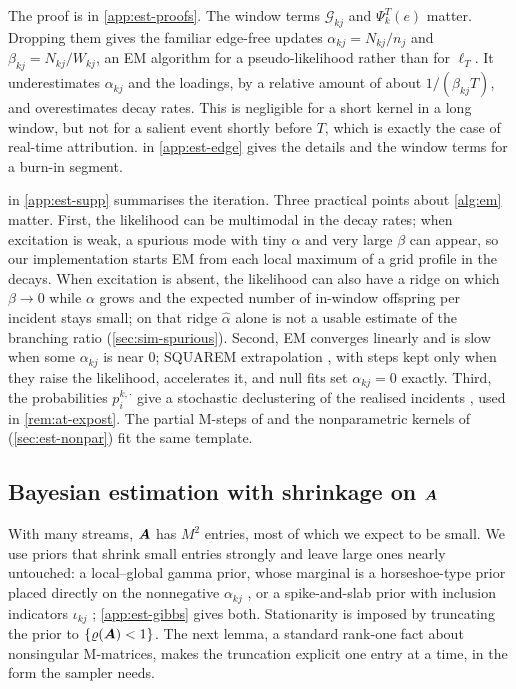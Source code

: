The proof is in \cref{app:est-proofs}. The window terms $\mathcal G_{kj}$ and
$\Psi^T_k(e)$ matter. Dropping them gives the familiar edge-free updates
$\alpha_{kj}=N_{kj}/n_j$ and $\beta_{kj}=N_{kj}/W_{kj}$, an EM algorithm for a
pseudo-likelihood rather than for $\ell_T$. It underestimates $\alpha_{kj}$ and the loadings,
by a relative amount of about $1/(\beta_{kj}T)$, and overestimates decay rates. This is
negligible for a short kernel in a long window, but not for a salient event shortly before
$T$, which is exactly the case of real-time attribution.  in
\cref{app:est-edge} gives the details and the window terms for a burn-in segment.

 in \cref{app:est-supp} summarises the iteration. Three practical points about \cref{alg:em} matter. First, the likelihood can be
multimodal in the decay rates; when excitation is weak, a spurious mode with tiny $\alpha$
and very large $\beta$ can appear, so our implementation starts EM from each local maximum
of a grid profile in the decays. When excitation is absent, the likelihood can also have a
ridge on which $\beta\to0$ while $\alpha$ grows and the expected number of in-window
offspring per incident stays small; on that ridge $\hat\alpha$ alone is not a usable
estimate of the branching ratio (\cref{sec:sim-spurious}). Second, EM converges linearly
and is slow when some $\alpha_{kj}$ is near $0$; SQUAREM extrapolation \citep{varadhan2008},
with steps kept only when they raise the likelihood, accelerates it, and null fits set
$\alpha_{kj}=0$ exactly. Third, the probabilities $p^{k,\cdot}_i$ give a stochastic
declustering of the realised incidents \citep{marsan2008}, used in \cref{rem:at-expost}.
The partial M-steps of \citet{veen2008} and the nonparametric kernels of \citet{lewis2011}
(\cref{sec:est-nonpar}) fit the same template.

\subsection{Bayesian estimation with shrinkage on \texorpdfstring{$\bm{A}$}{A}}\label{sec:est-bayes}

With many streams, $\bm{A}$ has $M^2$ entries, most of which we expect to be small. We use
priors that shrink small entries strongly and leave large ones nearly untouched: a
local--global gamma prior, whose marginal is a horseshoe-type prior placed directly on the
nonnegative $\alpha_{kj}$ \citep{carvalho2010,armagan2011}, or a spike-and-slab prior with
inclusion indicators $\iota_{kj}$ \citep{linderman2014}; \cref{app:est-gibbs} gives both.
Stationarity is imposed by truncating the prior to $\{\varrho(\bm{A})<1\}$. The next lemma, a
standard rank-one fact about nonsingular M-matrices, makes the truncation explicit one
entry at a time, in the form the sampler needs.

